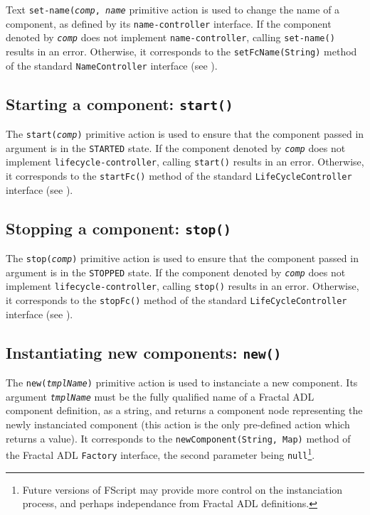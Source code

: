 \documentclass[a4paper,12pt]{report}
\begin{document}
Text \texttt{set-name(\textsl{comp}, \textsl{name}} primitive action is used to change the
name of a component, as defined by its \texttt{name-controller} interface. If the
component denoted by \texttt{\textsl{comp}} does not implement \texttt{name-controller},
calling \texttt{set-name()} results in an error. Otherwise, it corresponds to the
\texttt{setFcName(String)} method of the standard \texttt{NameController} interface (see
\citep[Sec.~4.4, p.~17]{bruneton-coupaye-stefani.ow2003}).

\subsection{Starting a component: \texttt{start()}}
\label{sec:action:start}

The \texttt{start(\textsl{comp})} primitive action is used to ensure that the component
passed in argument is in the \texttt{STARTED} state. If the component denoted by
\texttt{\textsl{comp}} does not implement \texttt{lifecycle-controller}, calling
\texttt{start()} results in an error. Otherwise, it corresponds to the \texttt{startFc()}
method of the standard \texttt{LifeCycleController} interface (see \citep[Sec.~4.5,
p.~17]{bruneton-coupaye-stefani.ow2003}).

\subsection{Stopping a component: \texttt{stop()}}
\label{sec:action:stop}

The \texttt{stop(\textsl{comp})} primitive action is used to ensure that the component
passed in argument is in the \texttt{STOPPED} state. If the component denoted by
\texttt{\textsl{comp}} does not implement \texttt{lifecycle-controller}, calling
\texttt{stop()} results in an error. Otherwise, it corresponds to the \texttt{stopFc()}
method of the standard \texttt{LifeCycleController} interface (see \citep[Sec.~4.5,
p.~17]{bruneton-coupaye-stefani.ow2003}).

\subsection{Instantiating new components: \texttt{new()}}
\label{sec:action:new}

The \texttt{new(\textsl{tmplName})} primitive action is used to instanciate a new
component. Its argument \texttt{\textsl{tmplName}} must be the fully qualified name of a
Fractal ADL component definition, as a string, and returns a component node representing
the newly instanciated component (this action is the only pre-defined action which returns
a value). It corresponds to the \texttt{newComponent(String, Map)} method of the Fractal
ADL \texttt{Factory} interface, the second parameter being \texttt{null}\footnote{Future
  versions of FScript may provide more control on the instanciation process, and perhaps
  independance from Fractal ADL definitions.}.
\end{document}
